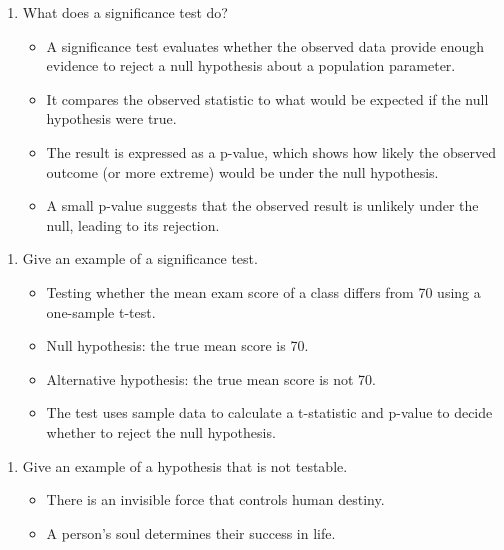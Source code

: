 \documentclass[12pt,a4paper]{article}
\providecommand{\tightlist}{%
  \setlength{\itemsep}{0pt}\setlength{\parskip}{0pt}}
\begin{document}
\onehalfspacing

\noindent

\begin{enumerate}
\def\labelenumi{\arabic{enumi}.}
\tightlist
\item
  What does a significance test do?

  \begin{itemize}
  \tightlist
  \item
    A significance test evaluates whether the observed data provide
    enough evidence to reject a null hypothesis about a population
    parameter.
  \item
    It compares the observed statistic to what would be expected if the
    null hypothesis were true.
  \item
    The result is expressed as a p-value, which shows how likely the
    observed outcome (or more extreme) would be under the null
    hypothesis.
  \item
    A small p-value suggests that the observed result is unlikely under
    the null, leading to its rejection.
  \end{itemize}
\end{enumerate}

\bigskip

\begin{enumerate}
\def\labelenumi{\arabic{enumi}.}
\setcounter{enumi}{1}
\tightlist
\item
  Give an example of a significance test.

  \begin{itemize}
  \tightlist
  \item
    Testing whether the mean exam score of a class differs from 70 using
    a one-sample t-test.
  \item
    Null hypothesis: the true mean score is 70.
  \item
    Alternative hypothesis: the true mean score is not 70.
  \item
    The test uses sample data to calculate a t-statistic and p-value to
    decide whether to reject the null hypothesis.
  \end{itemize}
\end{enumerate}

\bigskip

\begin{enumerate}
\def\labelenumi{\arabic{enumi}.}
\setcounter{enumi}{2}
\tightlist
\item
  Give an example of a hypothesis that is not testable.

  \begin{itemize}
  \tightlist
  \item
    There is an invisible force that controls human destiny.
  \item
    A person's soul determines their success in life.
  \end{itemize}
\end{enumerate}
\end{document}

